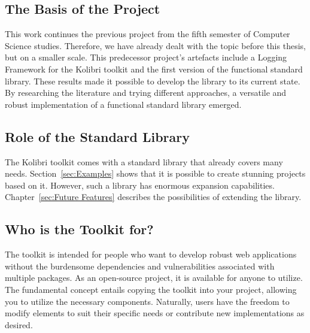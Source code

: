 \subsection{The Basis of the Project}
\label{sub:The Basis of the Project}
This work continues the previous project from the fifth semester of Computer
Science studies. Therefore, we have already dealt with the topic before this thesis,
but on a smaller scale. This predecessor project's artefacts include a Logging Framework
for the Kolibri toolkit and the first version of the functional standard
library. These results made it possible to develop the library to its current
state. By researching the literature and trying different approaches, a
versatile and robust implementation of a functional standard library emerged.

\subsection{Role of the Standard Library}
\label{sub:Role of the Standard Library}
The Kolibri toolkit comes with a standard library that already covers many
needs. Section~\ref{sec:Examples} shows that it is possible to create stunning
projects based on it. However, such a library has enormous expansion
capabilities. Chapter~\ref{sec:Future Features} describes the possibilities of
extending the library.

\subsection{Who is the Toolkit for?}
\label{sub:Who is the Toolkit for?}
The toolkit is intended for people who want to develop robust web applications
without the burdensome dependencies and vulnerabilities associated with
multiple packages. As an open-source project, it is available for anyone to
utilize. The fundamental concept entails copying the toolkit into your project,
allowing you to utilize the necessary components. Naturally, users have the
freedom to modify elements to suit their specific needs or contribute new
implementations as desired.

